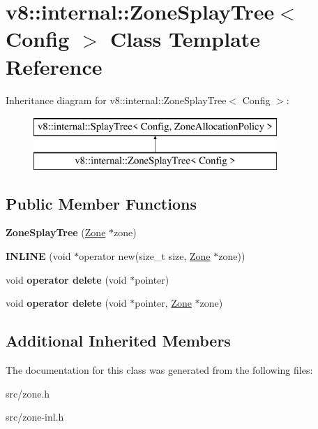 \hypertarget{classv8_1_1internal_1_1_zone_splay_tree}{}\section{v8\+:\+:internal\+:\+:Zone\+Splay\+Tree$<$ Config $>$ Class Template Reference}
\label{classv8_1_1internal_1_1_zone_splay_tree}
Inheritance diagram for v8\+:\+:internal\+:\+:Zone\+Splay\+Tree$<$ Config $>$\+:\begin{figure}[H]
\begin{center}
\leavevmode
\includegraphics[height=2.000000cm]{classv8_1_1internal_1_1_zone_splay_tree}
\end{center}
\end{figure}
\subsection*{Public Member Functions}
\begin{DoxyCompactItemize}
\item 
\hypertarget{classv8_1_1internal_1_1_zone_splay_tree_a6868fea9a91c5e1fc46f1abf51dd7af8}{}{\bfseries Zone\+Splay\+Tree} (\hyperlink{classv8_1_1internal_1_1_zone}{Zone} $\ast$zone)\label{classv8_1_1internal_1_1_zone_splay_tree_a6868fea9a91c5e1fc46f1abf51dd7af8}

\item 
\hypertarget{classv8_1_1internal_1_1_zone_splay_tree_ad5f6cb9fb81feadc4938ae3f80baeaf6}{}{\bfseries I\+N\+L\+I\+N\+E} (void $\ast$operator new(size\+\_\+t size, \hyperlink{classv8_1_1internal_1_1_zone}{Zone} $\ast$zone))\label{classv8_1_1internal_1_1_zone_splay_tree_ad5f6cb9fb81feadc4938ae3f80baeaf6}

\item 
\hypertarget{classv8_1_1internal_1_1_zone_splay_tree_aafa8e3637ae4d23427728fbc49a5e2f5}{}void {\bfseries operator delete} (void $\ast$pointer)\label{classv8_1_1internal_1_1_zone_splay_tree_aafa8e3637ae4d23427728fbc49a5e2f5}

\item 
\hypertarget{classv8_1_1internal_1_1_zone_splay_tree_aea0e42a989045676e5ae837b96397d48}{}void {\bfseries operator delete} (void $\ast$pointer, \hyperlink{classv8_1_1internal_1_1_zone}{Zone} $\ast$zone)\label{classv8_1_1internal_1_1_zone_splay_tree_aea0e42a989045676e5ae837b96397d48}

\end{DoxyCompactItemize}
\subsection*{Additional Inherited Members}


The documentation for this class was generated from the following files\+:\begin{DoxyCompactItemize}
\item 
src/zone.\+h\item 
src/zone-\/inl.\+h\end{DoxyCompactItemize}
